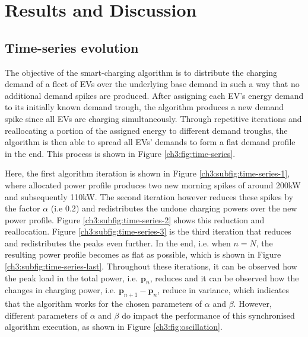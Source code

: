 \section{Results and Discussion}
\label{ch3:sec:results}

\subsection{Time-series evolution}
\label{ch3:subsec:time-series-evolution}

The objective of the smart-charging algorithm is to distribute the charging demand of a fleet of EVs over the underlying base demand in such a way that no additional demand spikes are produced.
After assigning each EV's energy demand to its initially known demand trough, the algorithm produces a new demand spike since all EVs are charging simultaneously.
Through repetitive iterations and reallocating a portion of the assigned energy to different demand troughs, the algorithm is then able to spread all EVs' demands to form a flat demand profile in the end.
This process is shown in Figure \ref{ch3:fig:time-series}.



Here, the first algorithm iteration is shown in Figure \ref{ch3:subfig:time-series-1}, where allocated power profile produces two new morning spikes of around 200kW and subsequently 110kW.
The second iteration however reduces these spikes by the factor $\alpha$ (i.e $0.2$) and redistributes the undone charging powers over the new power profile.
Figure \ref{ch3:subfig:time-series-2} shows this reduction and reallocation.
Figure \ref{ch3:subfig:time-series-3} is the third iteration that reduces and redistributes the peaks even further.
In the end, i.e. when $n=N$, the resulting power profile becomes as flat as possible, which is shown in Figure \ref{ch3:subfig:time-series-last}.
Throughout these iterations, it can be observed how the peak load in the total power, i.e. $\textbf{p}_n$, reduces and it can be observed how the changes in charging power, i.e. $\textbf{p}_{n+1}-\textbf{p}_n$, reduce in variance, which indicates that the algorithm works for the chosen parameters of $\alpha$ and $\beta$.
However, different parameters of $\alpha$ and $\beta$ do impact the performance of this synchronised algorithm execution, as shown in Figure \ref{ch3:fig:oscillation}.



